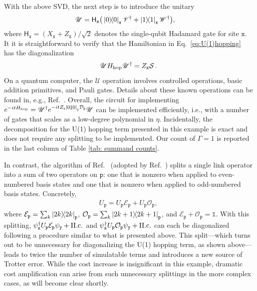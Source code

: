 \documentclass[aps,prd,twocolumn,showpacs,groupedaddress,superscriptaddress,nofootinbib,floatfix,preprintnumbers,longbibliography]{revtex4-1}
\begin{document}
With the above SVD, the next step is to introduce the unitary
%
\begin{align}
  \mathscr{U}&=\mathsf{H}_\mathtt{x} \big(\ket{0}\!\!\bra{0}_\mathtt{x}  \mathscr{V}^\dagger+\ket{1}\!\!\bra{1}_\mathtt{x}  \mathscr{W}^\dagger\big),
  \label{eq:unitaryForSVD}
\end{align}
%
where $\mathsf{H}_{\mathtt{x}}=(X_{\mathtt{x}}+Z_{\mathtt{x}})/\sqrt{2}$ denotes the single-qubit Hadamard gate for site $\mathtt{x}$. It it is straightforward to verify that the Hamiltonian in Eq.~\eqref{eq:U(1)hopping} has the diagonalization
%
\begin{equation}
\mathscr{U} H_{\rm hop} \mathscr{U}^\dagger = Z_\mathtt{x}\mathcal{S} \, .
\end{equation}
%
On a quantum computer, the $\mathscr{U}$ operation involves controlled operations, basic addition primitives, and Pauli gates. Details about these known operations can be found in, e.g., Ref.~\cite{Davoudi:2022xmb}. Overall, the circuit for implementing $e^{-itH_{\rm hop}}=\mathscr{U}^\dagger e^{-it Z_\mathtt{x} \ket{0}\!\!\bra{0}_\mathtt{y} \mathcal{D}_\mathtt{p}} \mathscr{U}$ can be implemented efficiently, i.e., with a number of gates that scales as a low-degree polynomial in $\eta$. Incidentally, the decomposition for the U(1) hopping term presented in this example is exact and does not require any splitting to be implemented. Our count of $\Gamma=1$ is reported in the last column of Table \ref{tab: summand counts}.

In contrast, the algorithm of Ref.~\cite{Shaw:2020udc} (adopted by Ref.~\cite{Kan:2021xfc}) splits a single link operator into a sum of two operators on $\mathtt{p}$: one that is nonzero when applied to even-numbered basis states and one that is nonzero when applied to odd-numbered basis states.
Concretely, 
%
\begin{align}
U_\mathtt{p}= U_\mathtt{p} \mathcal{E}_\mathtt{p}+U_\mathtt{p} \mathcal{O}_\mathtt{p},
\label{eq:split}
\end{align}
%
where $\mathcal{E}_\mathtt{p}= \sum_k \ket{2k}\!\!\bra{2k}_\mathtt{p}$, $\mathcal{O}_\mathtt{p}= \sum_k \ket{2k+1}\!\!\bra{2k+1}_\mathtt{p}$, and $\mathcal{E}_\mathtt{p}+\mathcal{O}_\mathtt{p} = \mathds{1} $. With this splitting, $\psi_{\mathtt{x}}^\dagger U_\mathtt{p} \mathcal{E}_\mathtt{p} \psi_{\mathtt{y}} + {\rm H.c.}$ and $\psi_{\mathtt{x}}^\dagger U_\mathtt{p} \mathcal{O}_\mathtt{p} \psi_{\mathtt{y}} + {\rm H.c.}$ can each be diagonalized following a procedure similar to what is presented above. This split---which turns out to be unnecessary for diagonalizing the U(1) hopping term, as shown above---leads to twice the number of simulatable terms and introduces a new source of Trotter error. While the cost increase is insignificant in this example, dramatic cost amplification can arise from such unnecessary splittings in the more complex cases, as will become clear shortly.
\end{document}
